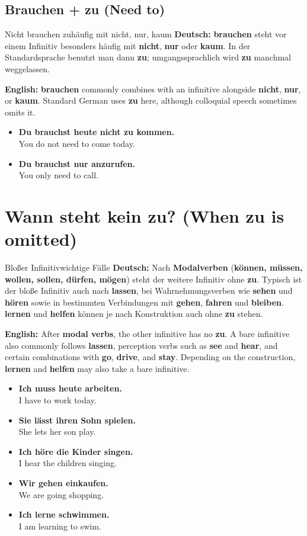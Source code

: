 \documentclass[a4paper,11pt]{article}
\newcommand{\GermanText}[1]{\textbf{Deutsch: }#1\par}
\newcommand{\EnglishText}[1]{{\small\color{SoftGray}\textbf{English: }#1\par}}
\newcommand{\ExampleItem}[2]{\item \textbf{#1}\\{\small\color{SoftGray}#2}}
\begin{document}
\subsection{Brauchen + zu \textnormal{(Need to)}}
\begin{grammarentry}{Nicht brauchen zu}{häufig mit nicht, nur, kaum}
\GermanText{\textbf{brauchen} steht vor einem Infinitiv besonders häufig mit \textbf{nicht}, \textbf{nur} oder \textbf{kaum}. In der Standardsprache benutzt man dann \textbf{zu}; umgangssprachlich wird \textbf{zu} manchmal weggelassen.}
\EnglishText{\textbf{brauchen} commonly combines with an infinitive alongside \textbf{nicht}, \textbf{nur}, or \textbf{kaum}. Standard German uses \textbf{zu} here, although colloquial speech sometimes omits it.}
\end{grammarentry}
\begin{exbox}\begin{itemize}
\ExampleItem{Du brauchst heute nicht zu kommen.}{You do not need to come today.}
\ExampleItem{Du brauchst nur anzurufen.}{You only need to call.}
\end{itemize}\end{exbox}

\section{Wann steht kein zu? \textnormal{(When zu is omitted)}}
\begin{grammarentry}{Bloßer Infinitiv}{wichtige Fälle}
\GermanText{Nach \textbf{Modalverben} (\textbf{können, müssen, wollen, sollen, dürfen, mögen}) steht der weitere Infinitiv ohne \textbf{zu}. Typisch ist der bloße Infinitiv auch nach \textbf{lassen}, bei Wahrnehmungsverben wie \textbf{sehen} und \textbf{hören} sowie in bestimmten Verbindungen mit \textbf{gehen}, \textbf{fahren} und \textbf{bleiben}. \textbf{lernen} und \textbf{helfen} können je nach Konstruktion auch ohne \textbf{zu} stehen.}
\EnglishText{After \textbf{modal verbs}, the other infinitive has no \textbf{zu}. A bare infinitive also commonly follows \textbf{lassen}, perception verbs such as \textbf{see} and \textbf{hear}, and certain combinations with \textbf{go}, \textbf{drive}, and \textbf{stay}. Depending on the construction, \textbf{lernen} and \textbf{helfen} may also take a bare infinitive.}
\end{grammarentry}
\begin{exbox}\begin{itemize}
\ExampleItem{Ich muss heute arbeiten.}{I have to work today.}
\ExampleItem{Sie lässt ihren Sohn spielen.}{She lets her son play.}
\ExampleItem{Ich höre die Kinder singen.}{I hear the children singing.}
\ExampleItem{Wir gehen einkaufen.}{We are going shopping.}
\ExampleItem{Ich lerne schwimmen.}{I am learning to swim.}
\end{itemize}\end{exbox}
\end{document}

